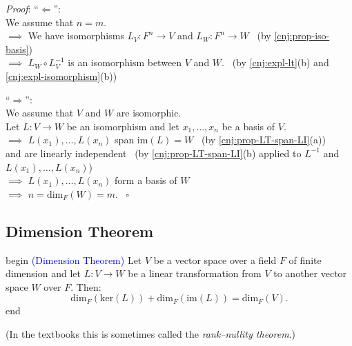 \documentclass[
  12pt,
  a4paper,
  twoside]{article}
\theoremstyle{plain}
\theoremstyle{definition}
\begin{document}
\emph{Proof}: ``\(\Longleftarrow\)'':\\
We assume that \(n = m\).\\
\(\implies\) We have isomorphisms \(L_{V}: F^{n} \to V\) and \(L_{W}: F^{n} \to W\) \hfill~{(by \ref{cnj:prop-iso-basis})}\\
\(\implies\) \(L_{W} \circ L_{V}^{-1}\) is an isomorphism between \(V\) and \(W\). \hfill~{(by \ref{cnj:expl-lt}(b) and \ref{cnj:expl-isomorphism}(b))}

``\(\Longrightarrow\)'':\\
We assume that \(V\) and \(W\) are isomorphic.\\
Let \(L: V \to W\) be an isomorphism and let \(x_{1}, \dots, x_{n}\) be a basis of \(V\).\\
\(\implies\) \(L(x_{1}), \dots, L(x_{n})\) span \(\mathrm{im}(L)=W\) \hfill~{(by \ref{cnj:prop-LT-span-LI}(a))}\\
\hspace*{0.333em}\hspace*{0.333em}\hspace*{0.333em}\hspace*{0.333em}\hspace*{0.333em}\hspace*{0.333em}\hspace*{0.333em}\hspace*{0.333em}\hspace*{0.333em} and are linearly independent \hfill~{(by \ref{cnj:prop-LT-span-LI}(b) applied to \(L^{-1}\) and \(L(x_{1}), \dots, L(x_{n})\))}\\
\(\implies\) \(L(x_{1}), \dots, L(x_{n})\) form a basis of \(W\)\\
\(\implies\) \(n = \mathrm{dim}_{F}(W) = m\). \hfill~{\(\square\)}

\hypertarget{ss-dimthm}{%
\subsection{Dimension Theorem}\label{ss-dimthm}}

\csname begin\label{cnj:thm-dimthm}
\textcolor{blue}{(Dimension Theorem)}
Let \(V\) be a vector space over a field \(F\) of finite dimension and let \(L: V \to W\) be a linear transformation from \(V\) to another vector space \(W\) over \(F\). Then:
\[
\boxed{\mathrm{dim}_{F}(\mathrm{ker}(L)) + \mathrm{dim}_{F}(\mathrm{im}(L)) = \mathrm{dim}_{F}(V).}
\]
\csname end

(In the textbooks this is sometimes called the \emph{rank--nullity theorem}.)
\end{document}
